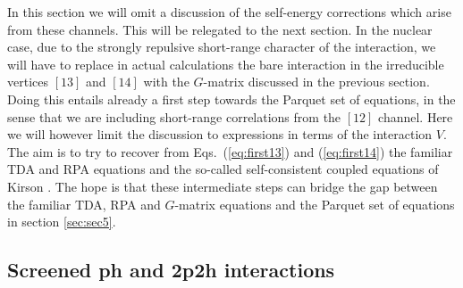 In this section we will omit a discussion of the self-energy corrections
which arise from these channels. This
will be relegated to the next section. In the nuclear
case, due to the strongly repulsive short-range character 
of the interaction, we will have 
to replace in actual calculations 
the bare interaction in the irreducible vertices $[13]$ and $[14]$
with the $G$-matrix discussed in the previous section. 
Doing this entails already a first step towards the Parquet set of equations,
in the sense that we are including short-range correlations from the 
$[12]$ channel. 
Here we will however limit the discussion to expressions 
in terms of the interaction $V$.
The aim is to try 
to recover from Eqs.\ (\ref{eq:first13}) 
and (\ref{eq:first14}) the familiar TDA and RPA equations and the 
so-called self-consistent coupled equations of Kirson \cite{kirson74}.
The hope is that these intermediate steps can bridge the 
gap between the familiar
TDA, RPA and $G$-matrix equations and the Parquet set of equations
in section \ref{sec:sec5}. 



\subsection{Screened ph  and 2p2h interactions}


